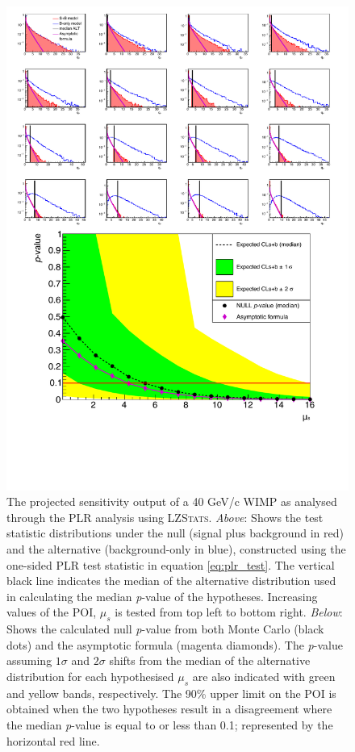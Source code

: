 {\begin{figure}[H!]
    \centering
    \vspace{-1cm}
    \includegraphics[scale=0.72]{Chapter_5/Figures/sensitivity_studies/statistical_distributions.pdf}
    \caption[The projected sensitivity output from the \textsc{LZStats} package used for the PLR analysis.]%
    {The projected sensitivity output of a 40 GeV/c\squared{} WIMP as analysed through the PLR analysis using \textsc{LZStats}. \textit{Above}: Shows the test statistic distributions under the null (signal plus background in red) and the alternative (background-only in blue), constructed using the one-sided PLR test statistic in equation \ref{eq:plr_test}. The vertical black line indicates the median of the alternative distribution used in calculating the median \textit{p}-value of the hypotheses. Increasing values of the POI, $\mu_{s}$ is tested from top left to bottom right. \textit{Below}: Shows the calculated null \textit{p}-value from both Monte Carlo (black dots) and the asymptotic formula (magenta diamonds). The \textit{p}-value assuming $1\sigma$ and $2\sigma$ shifts from the median of the alternative distribution for each hypothesised $\mu_{s}$ are also indicated with green and yellow bands, respectively. The 90\% upper limit on the POI is obtained when the two hypotheses result in a disagreement where the median \textit{p}-value is equal to or less than 0.1; represented by the horizontal red line.}
    \label{fig:plr_hypothesis_distributions}
\end{figure}
%

}
